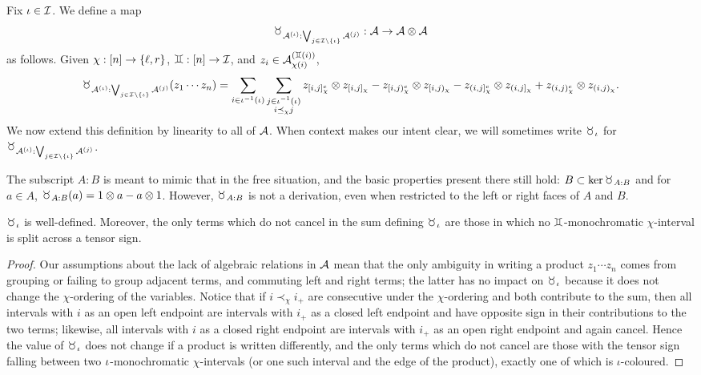 \begin{definition}
	Fix $\iota \in \mathcal{I}$.
	We define a map
	$$\taur_{\A^{(\iota)} : \bigvee_{j \in \I\setminus\set{\iota}} \A^{(j)}} : \A \to \A \otimes \A$$
	as follows.
	Given $\chi : [n] \to \left\{\ell, r\right\}$, $\gem: [n] \to \I$, and $z_i \in \A^{(\gem(i))}_{\chi(i)}$,
	$$
	\taur_{\A^{(\iota)} : \bigvee_{j \in \I\setminus\set{\iota}} \A^{(j)}}(z_1\cdots z_n)
	= \sum_{i \in \e^{-1}(\iota)} \sum_{\substack{j\in\e^{-1}(\iota)\\i \preceq_\chi j}}
	z_{[i,j]_\chi^c} \otimes z_{[i,j]_\chi}
	- z_{[i,j)_\chi^c}\otimes z_{[i,j)_\chi}
	- z_{(i,j]_\chi^c}\otimes z_{(i,j]_\chi}
	+ z_{(i,j)_\chi^c}\otimes z_{(i,j)_\chi}.
	$$
	We now extend this definition by linearity to all of $\mathcal{A}$.
	When context makes our intent clear, we will sometimes write $\taur_\iota$ for $\taur_{\A^{(\iota)} : \bigvee_{j \in \I\setminus\set{\iota}} \A^{(j)}}$.

	The subscript $A : B$ is meant to mimic that in the free situation, and the basic properties present there still hold: $B \subset \ker\taur_{A:B}$ and for $a \in A$, $\taur_{A:B}(a) = 1\otimes a-a\otimes 1$.
	However, $\taur_{A:B}$ is not a derivation, even when restricted to the left or right faces of $A$ and $B$.
\end{definition}
\begin{lemma}
	\label{lem:taur}
	$\taur_\iota$ is well-defined.
	Moreover, the only terms which do not cancel in the sum defining $\taur_\iota$ are those in which no $\gem$-monochromatic $\chi$-interval is split across a tensor sign.
\end{lemma}
\begin{proof}
	Our assumptions about the lack of algebraic relations in $\mathcal{A}$ mean that the only ambiguity in writing a product $z_1\cdots z_n$ comes from grouping or failing to group adjacent terms, and commuting left and right terms; the latter has no impact on $\taur_\iota$ because it does not change the $\chi$-ordering of the variables.
	Notice that if $i \prec_\chi i_+$ are consecutive under the $\chi$-ordering and both contribute to the sum, then all intervals with $i$ as an open left endpoint are intervals with $i_+$ as a closed left endpoint and have opposite sign in their contributions to the two terms; likewise, all intervals with $i$ as a closed right endpoint are intervals with $i_+$ as an open right endpoint and again cancel.
	Hence the value of $\taur_\iota$ does not change if a product is written differently, and the only terms which do not cancel are those with the tensor sign falling between two $\iota$-monochromatic $\chi$-intervals (or one such interval and the edge of the product), exactly one of which is $\iota$-coloured.
\end{proof}


